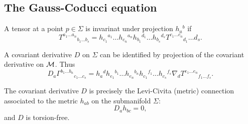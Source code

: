 \subsection*{The Gauss-Coducci equation} A tensor at a point $p\in \Sigma$ is invarinat under projection $h_a{}^b$ if
\begin{equation}
    T^{a_1\ldots a_n}{}_{b_1 \ldots b_s}= h_{c_1}{}^{a_1}\ldots h_{c_n}{}^{a_n} h_{b_1}{}^{d_1}\ldots h_{b_s}{}^{d_s}T^{c_1\ldots c_n}{}_{d_1}\ldots {d_s}.
\end{equation}
\begin{prop}
A covariant derivative $D$ on $\Sigma$ can be identified by projection of the covariant derivative on $\mathcal{M}$. Thus
\begin{equation}
    D_a \Gamma^{b_1 \ldots b_n}{}_{c_1\ldots c_s}=h_a{}^d h_{e_1}{}^{b_1} \ldots h_{e_n}{}^{b_n} h_{c_1}{}^{f_1} \ldots h_{c_s}{}^{f_s} \nabla_d T^{e_1 \ldots e_n}{}_{f_1\ldots f_s}.
    \end{equation}
\end{prop}
\begin{lem}
    The covariant derivative $D$ is precisely the Levi-Civita (metric) connection associated to the metric $h_{ab}$ on the submanifold $\Sigma$:
    \begin{equation}
        D_a h_{bc}=0,
    \end{equation}
    and $D$ is torsion-free.
\end{lem}
